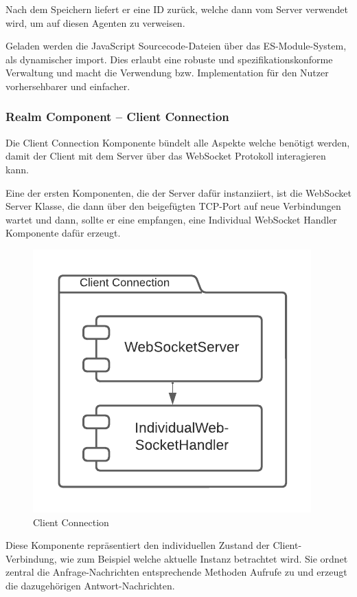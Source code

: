 Nach dem Speichern liefert er eine ID zurück, welche dann vom Server verwendet wird, um auf diesen Agenten zu verweisen.

Geladen werden die JavaScript Sourcecode-Dateien über das ES-Module-System, als dynamischer import.
Dies erlaubt eine robuste und spezifikationskonforme Verwaltung und macht die Verwendung bzw. Implementation für den Nutzer vorhersehbarer und einfacher.

\subsubsection{Realm Component – Client Connection}

Die Client Connection Komponente bündelt alle Aspekte welche benötigt werden, damit der Client mit dem Server über das WebSocket Protokoll interagieren kann.

Eine der ersten Komponenten, die der Server dafür instanziiert, ist die WebSocket Server Klasse, die dann über den beigefügten TCP-Port auf neue Verbindungen wartet und dann, sollte er eine empfangen, eine Individual WebSocket Handler Komponente dafür erzeugt.

\begin{figure}[htb]
    \centering
    \includegraphics[scale=.65,center]{medien/client-connection.pdf}
    \caption{Client Connection}
    \ownsource
    \label{fig:client-connection}
\end{figure}

\FloatBarrier

Diese Komponente repräsentiert den individuellen Zustand der Client-Ver\-bindung, wie zum Beispiel welche aktuelle Instanz betrachtet wird.
Sie ordnet zentral die Anfrage-Nachrichten entsprechende Methoden Aufrufe zu und erzeugt die dazugehörigen Antwort-Nachrichten.

